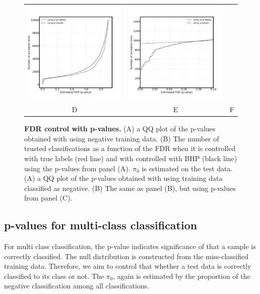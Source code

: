 \documentclass{article}
\begin{document}
\begin{figure}
\begin{tabular}{ccc}
		\includegraphics[width=2in]{img/test_pred_no_labels.png} &  
            \includegraphics[width=2in]{img/test_pred_no_labels_loc.png}  \\
		D & E & F \\
	\end{tabular}
	\caption{{\bf FDR control with p-values.}
		(A) a QQ plot of the p-values obtained with using negative training data. (B) The number of trusted classifications as a function of the FDR when it is controlled with true labels (red line) and with controlled with BHP (black line) using the p-values from panel (A). $\pi_0$ is estimated on the test data.
		(A) a QQ plot of the p-values obtained with using training data classified as negative. (B) The same as panel (B), but using p-values from panel (C).
	}
	\label{fig:examples}
\end{figure}


\subsection{p-values for multi-class classification}

For multi class classification, the p-value indicates significance of that a sample is correctly classified. The null distribution is constructed from the miss-classified training data. Therefore, we aim to control that whether a test data is correctly classified to its class or not. The $\pi_0$, again is estimated by the proportion of the negative classification among all classifications.
\end{document}
